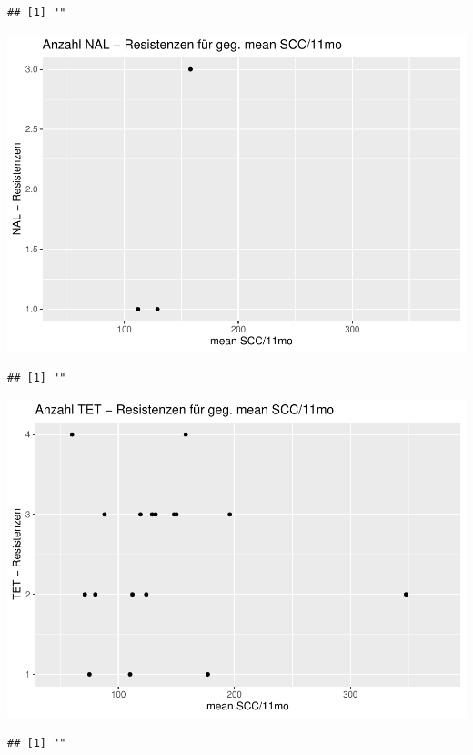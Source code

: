\documentclass[
]{article}
\begin{document}
\begin{verbatim}
## [1] ""
\end{verbatim}

\includegraphics{NResistenzen_files/figure-latex/unnamed-chunk-6-17.pdf}

\begin{verbatim}
## [1] ""
\end{verbatim}

\includegraphics{NResistenzen_files/figure-latex/unnamed-chunk-6-18.pdf}

\begin{verbatim}
## [1] ""
\end{verbatim}
\end{document}
